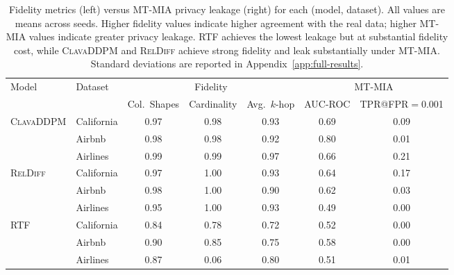 \begin{table}[t]
  \centering
  \small
  \setlength{\tabcolsep}{5pt}
  \caption{Fidelity metrics (left) versus MT-MIA privacy leakage (right) for each (model, dataset). All values are means across seeds. Higher fidelity values indicate higher agreement with the real data; higher MT-MIA values indicate greater privacy leakage. \textsc{RTF} achieves the lowest leakage but at substantial fidelity cost, while \textsc{ClavaDDPM} and \textsc{RelDiff} achieve strong fidelity and leak substantially under MT-MIA. Standard deviations are reported in Appendix~\ref{app:full-results}.}
  \label{tab:utility-vs-privacy}
  \begin{tabular}{llccc@{\hspace{1.5em}}cc}
    \toprule
    Model & Dataset & \multicolumn{3}{c}{Fidelity} & \multicolumn{2}{c}{MT-MIA} \\
    \cmidrule(lr){3-5} \cmidrule(lr){6-7}
     &  & Col.~Shapes & Cardinality & Avg.~$k$-hop & AUC-ROC & TPR@FPR$=$0.001 \\
    \midrule
    \textsc{ClavaDDPM} & California & 0.97 & 0.98 & 0.93 & 0.69 & 0.09 \\
     & Airbnb & 0.98 & 0.98 & 0.92 & 0.80 & 0.01 \\
     & Airlines & 0.99 & 0.99 & 0.97 & 0.66 & 0.21 \\
    \midrule
    \textsc{RelDiff} & California & 0.97 & 1.00 & 0.93 & 0.64 & 0.17 \\
     & Airbnb & 0.98 & 1.00 & 0.90 & 0.62 & 0.03 \\
     & Airlines & 0.95 & 1.00 & 0.93 & 0.49 & 0.00 \\
    \midrule
    \textsc{RTF} & California & 0.84 & 0.78 & 0.72 & 0.52 & 0.00 \\
     & Airbnb & 0.90 & 0.85 & 0.75 & 0.58 & 0.00 \\
     & Airlines & 0.87 & 0.06 & 0.80 & 0.51 & 0.01 \\
    \bottomrule
  \end{tabular}
\end{table}
